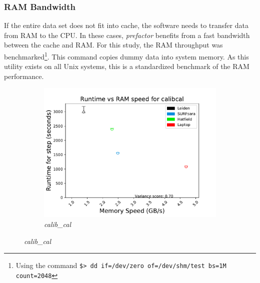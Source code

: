 \subsubsection{RAM Bandwidth}

If the entire data set does not fit into cache, the software needs to transfer data from RAM to the CPU. In these cases,  \textit{prefactor} benefits from a fast bandwidth between the cache and RAM. For this study, the RAM throughput was benchmarked\footnote{Using the command \texttt{\$> dd if=/dev/zero of=/dev/shm/test  bs=1M count=2048}}. This command copies dummy data into system memory. As this utility exists on all Unix systems, this is a standardized benchmark of the RAM performance. 

\begin{figure}
\begin{minipage}[b]{0.45\textwidth}
\begin{subfigure}[b]{\linewidth}
    \includegraphics[width=\textwidth]{ch4/figures/fig9/calibcal_MEM.pdf}
      \caption{\textit{calib\_cal}}
	\label{calib_cal_RAM}
 \end{subfigure}%
 \vspace*{5mm} %


\end{minipage}
\end{figure}
